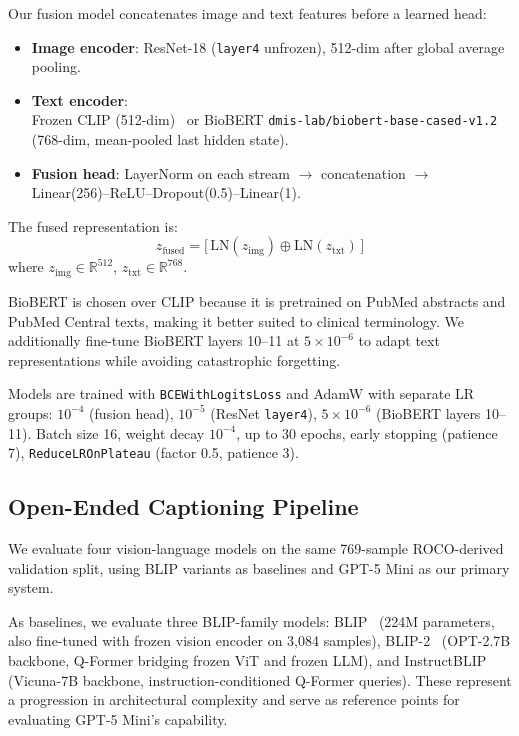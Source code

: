 \documentclass{article}
\begin{document}
Our fusion model concatenates image and text features before a learned head:
\begin{itemize}
  \item \textbf{Image encoder}: ResNet-18 (\texttt{layer4} unfrozen), 512-dim
        after global average pooling.
  \item \textbf{Text encoder}: \\Frozen CLIP (512-dim)~\cite{radford2021clip} or
        BioBERT \texttt{dmis-lab/biobert-base-cased-v1.2}~\cite{lee2020biobert}
        (768-dim, mean-pooled last hidden state).
  \item \textbf{Fusion head}: LayerNorm on each stream $\rightarrow$
        concatenation $\rightarrow$ Linear(256)--ReLU--Dropout(0.5)--Linear(1).
\end{itemize}

The fused representation is:
\begin{equation}
  z_{\text{fused}} = \bigl[\,\text{LN}(z_{\text{img}}) \oplus \text{LN}(z_{\text{txt}})\,\bigr]
\end{equation}
\hspace{4.65cm} where $z_{\text{img}} \in \mathbb{R}^{512}$, $z_{\text{txt}} \in \mathbb{R}^{768}$.

BioBERT is chosen over CLIP because it is pretrained on PubMed abstracts and
PubMed Central texts, making it better suited to clinical terminology. We
additionally fine-tune BioBERT layers 10--11 at $5\times10^{-6}$ to adapt text
representations while avoiding catastrophic forgetting.

Models are trained with \texttt{BCEWithLogitsLoss} and AdamW with separate LR
groups: $10^{-4}$ (fusion head), $10^{-5}$ (ResNet \texttt{layer4}), $5\times
10^{-6}$ (BioBERT layers 10--11). Batch size 16, weight decay $10^{-4}$, up to
30 epochs, early stopping (patience 7), \texttt{ReduceLROnPlateau} (factor 0.5,
patience 3).

\subsection{Open-Ended Captioning Pipeline}
\label{sec:vlm}

We evaluate four vision-language models on the same 769-sample ROCO-derived
validation split, using BLIP variants as baselines and GPT-5 Mini as our
primary system.

As baselines, we evaluate three BLIP-family models: BLIP~\cite{li2022blip}
(224M parameters, also fine-tuned with frozen vision encoder on 3,084 samples),
BLIP-2~\cite{li2023blip2} (OPT-2.7B backbone, Q-Former bridging frozen ViT and
frozen LLM), and InstructBLIP~\cite{dai2023instructblip} (Vicuna-7B backbone,
instruction-conditioned Q-Former queries). These represent a progression in
architectural complexity and serve as reference points for evaluating GPT-5
Mini's capability.
\end{document}
